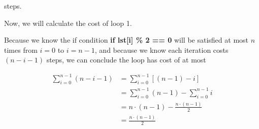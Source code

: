 \documentclass[12pt]{article}
\begin{document}
\begin{enumerate}[a.]
    steps.

    \bigskip

    Now, we will calculate the cost of loop 1.

    \bigskip

    Because we know the if condition \textbf{if lst[i] \% 2 == 0} will be satisfied
    at most $n$ times from $i = 0$ to $i = n - 1$, and because we know each
    iteration costs $(n - i - 1)$ steps, we can conclude the loop has cost of at most

    \begin{align}
        \sum\limits_{i=0}^{n-1} (n-i-1) &= \sum\limits_{i=0}^{n-1} \left[ (n-1) - i \right]\\
        &= \sum\limits_{i=0}^{n-1} (n-1) - \sum\limits_{i=0}^{n-1} i\\
        &= n \cdot (n-1) - \frac{n \cdot (n-1)}{2}\\
        &= \frac{n \cdot (n-1)}{2}
     \end{align}

\end{enumerate}
\end{document}
